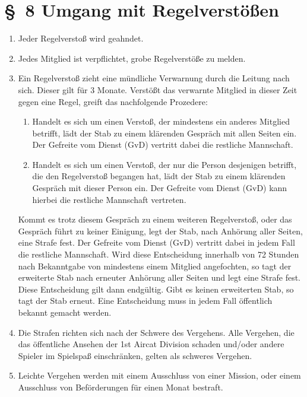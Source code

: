 \section*{\S~8 Umgang mit Regelverstößen}
\label{sec:umgang_mit_regelverstoeßen}

\begin{enumerate}[label=(\arabic*)]
    \item Jeder Regelverstoß wird geahndet.    
    \item Jedes Mitglied ist verpflichtet, grobe Regelverstöße zu melden.  
    \item\label{itm:vorgehen_bei_verstoß} Ein Regelverstoß zieht eine mündliche Verwarnung durch die Leitung nach sich. Dieser gilt für 3 Monate. Verstößt das verwarnte Mitglied in dieser Zeit gegen eine Regel, greift das nachfolgende Prozedere:
    \begin{enumerate}[label=(\Alph*)]
        \item Handelt es sich um einen Verstoß, der mindestens ein anderes Mitglied betrifft, lädt der Stab zu einem klärenden Gespräch mit allen Seiten ein. Der Gefreite vom Dienst (GvD) vertritt dabei die restliche Mannschaft.
        \item Handelt es sich um einen Verstoß, der nur die Person desjenigen betrifft, die den Regelverstoß begangen hat, lädt der Stab zu einem klärenden Gespräch mit dieser Person ein. Der Gefreite vom Dienst (GvD) kann hierbei die restliche Mannschaft vertreten.
    \end{enumerate}
    Kommt es trotz diesem Gespräch zu einem weiteren Regelverstoß, oder das Gespräch führt zu keiner Einigung, legt der Stab, nach Anhörung aller Seiten, eine Strafe fest. Der Gefreite vom Dienst (GvD) vertritt dabei in jedem Fall die restliche Mannschaft. Wird diese Entscheidung innerhalb von 72 Stunden nach Bekanntgabe von mindestens einem Mitglied angefochten, so tagt der erweiterte Stab nach erneuter Anhörung aller Seiten und legt eine Strafe fest. Diese Entscheidung gilt dann endgültig. Gibt es keinen erweiterten Stab, so tagt der Stab erneut. Eine Entscheidung muss in jedem Fall öffentlich bekannt gemacht werden.    
    \item\label{itm:schwerer_verstoß}Die Strafen richten sich nach der Schwere des Vergehens. Alle Vergehen, die das öffentliche Ansehen der 1st Aircat Division schaden und/oder andere Spieler im Spielspaß einschränken, gelten als schweres Vergehen.    
    \item Leichte Vergehen werden mit einem Ausschluss von einer Mission, oder einem Ausschluss von Beförderungen für einen Monat bestraft.    

\end{enumerate}
